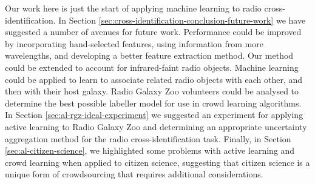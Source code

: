     Our work here is just the start of applying machine learning to radio
    cross-\\identification. In Section
    \ref{sec:cross-identification-conclusion-future-work} we have suggested a
    number of avenues for future work. Performance could be improved by
    incorporating hand-selected features, using information from more
    wavelengths, and developing a better feature extraction method. Our method
    could be extended to account for infrared-faint radio objects. Machine
    learning could be applied to learn to associate related radio objects with
    each other, and then with their host galaxy. Radio Galaxy Zoo volunteers
    could be analysed to determine the best possible labeller model for use in
    crowd learning algorithms. In Section \ref{sec:al-rgz-ideal-experiment} we
    suggested an experiment for applying active learning to Radio Galaxy Zoo and
    determining an appropriate uncertainty aggregation method for the radio
    cross-identification task. Finally, in Section \ref{sec:al-citizen-science},
    we highlighted some problems with active learning and crowd learning when
    applied to citizen science, suggesting that citizen science is a unique form
    of crowdsourcing that requires additional considerations.
